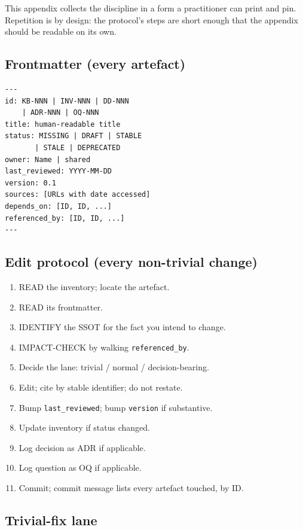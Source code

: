 \documentclass[11pt,a4paper,twocolumn]{article}
\begin{document}
This appendix collects the discipline in a form a practitioner can
print and pin. Repetition is by design: the protocol's steps are
short enough that the appendix should be readable on its own.

\subsection*{Frontmatter (every artefact)}

\begin{verbatim}
---
id: KB-NNN | INV-NNN | DD-NNN
    | ADR-NNN | OQ-NNN
title: human-readable title
status: MISSING | DRAFT | STABLE
       | STALE | DEPRECATED
owner: Name | shared
last_reviewed: YYYY-MM-DD
version: 0.1
sources: [URLs with date accessed]
depends_on: [ID, ID, ...]
referenced_by: [ID, ID, ...]
---
\end{verbatim}

\subsection*{Edit protocol (every non-trivial change)}

\begin{enumerate}[nosep,leftmargin=1.2em]
\item READ the inventory; locate the artefact.
\item READ its frontmatter.
\item IDENTIFY the SSOT for the fact you intend to change.
\item IMPACT-CHECK by walking \texttt{referenced\_by}.
\item Decide the lane: trivial / normal / decision-bearing.
\item Edit; cite by stable identifier; do not restate.
\item Bump \texttt{last\_reviewed}; bump \texttt{version} if substantive.
\item Update inventory if status changed.
\item Log decision as ADR if applicable.
\item Log question as OQ if applicable.
\item Commit; commit message lists every artefact touched, by ID.
\end{enumerate}

\subsection*{Trivial-fix lane}
\end{document}
